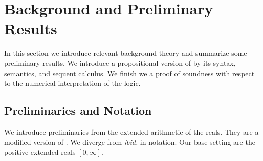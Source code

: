 \section{Background and Preliminary Results} \label{section:CurrentApproach}

In this section we introduce relevant background theory and summarize some preliminary results. We introduce a propositional version of \OL{} by its syntax, semantics, and sequent calculus. We finish we a proof of soundness with respect to the numerical interpretation of the logic.%

\subsection{Preliminaries and Notation}
\label{Preliminaries}
We introduce preliminaries from the extended arithmetic of the reals. They are a modified version of \cite{capucci2024quantifiers}. We diverge from \emph{ibid.} in notation. Our base setting are the positive extended reals $[0,\infty]$. %

